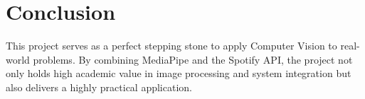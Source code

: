 \documentclass[12pt,a4paper]{article}
\begin{document}
\section{Conclusion}
This project serves as a perfect stepping stone to apply Computer Vision to real-world problems. By combining MediaPipe and the Spotify API, the project not only holds high academic value in image processing and system integration but also delivers a highly practical application.
\end{document}
